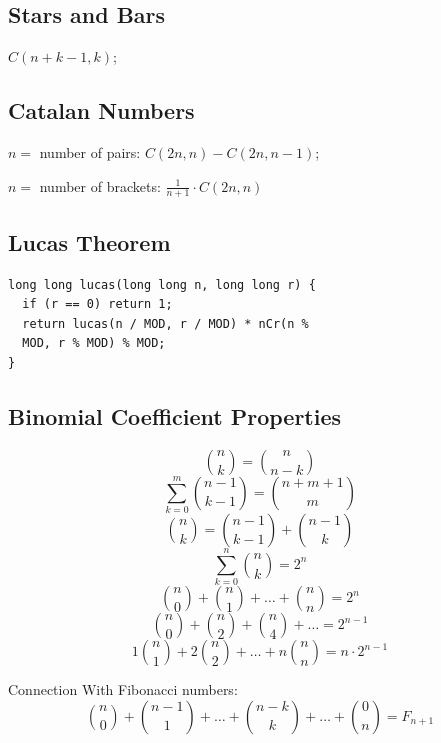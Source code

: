 \subsection{Stars and Bars}
$C(n + k - 1, k)$;
\subsection{Catalan Numbers}
$n=$ number of pairs: $C(2n, n) - C(2n, n-1)$;

$n=$ number of brackets: $\frac{1}{n+1} \cdot C(2n, n)$
\subsection{Lucas Theorem}
\begin{verbatim}
long long lucas(long long n, long long r) {
  if (r == 0) return 1;
  return lucas(n / MOD, r / MOD) * nCr(n %
  MOD, r % MOD) % MOD;
}
\end{verbatim}
\subsection{Binomial Coefficient Properties}
\[
\binom{n}{k} = \binom{n}{n-k}
\]
\[
\sum_{k=0}^{m} \binom{n-1}{k-1} = \binom{n+m+1}{m}
\]
\[
\binom{n}{k} = \binom{n-1}{k-1} + \binom{n-1}{k}
\]
\[
\sum_{k=0}^{n} \binom{n}{k} = 2^n
\]
\[
\binom{n}{0} + \binom{n}{1} + \ldots + \binom{n}{n} = 2^n
\]
\[
\binom{n}{0} + \binom{n}{2} + \binom{n}{4} + \ldots = 2^{n-1}
\]
\[
1\binom{n}{1} + 2\binom{n}{2} + \ldots + n\binom{n}{n} = n \cdot 2^{n-1}
\]

Connection With Fibonacci numbers:
\[
\binom{n}{0} + \binom{n-1}{1} + \ldots + \binom{n-k}{k} + \ldots + \binom{0}{n} = F_{n+1}
\]

